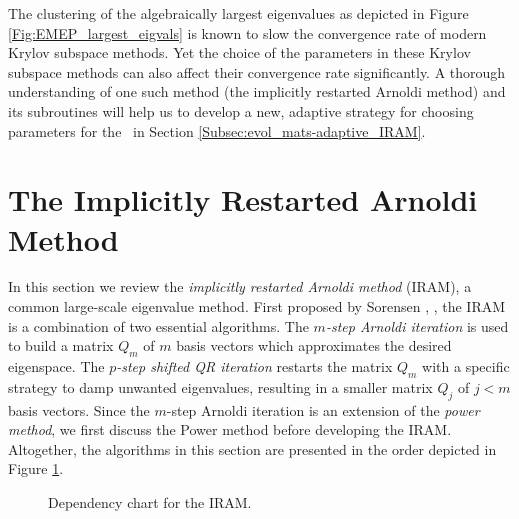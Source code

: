 The clustering of the algebraically largest eigenvalues as depicted in Figure \ref{Fig:EMEP_largest_eigvals} is known to slow the convergence rate of modern Krylov subspace methods.
Yet the choice of the parameters in these Krylov subspace methods can also affect their convergence rate significantly.
A thorough understanding of one such method (the implicitly restarted Arnoldi method) and its subroutines will help us to develop a new, adaptive strategy for choosing parameters for the \emep \ in Section \ref{Subsec:evol_mats-adaptive_IRAM}.






\section{The Implicitly Restarted Arnoldi Method}		\label{Subsec:evol_mats-IRAM}






In this section we review the \textit{implicitly restarted Arnoldi method} (IRAM), a common large-scale eigenvalue method.  
First proposed by Sorensen \cite{sorensen1992implicit}, \cite{sorensen1997implicitly}, the IRAM is a combination of two essential algorithms.  
The \textit{$m$-step Arnoldi iteration} is used to build a matrix $Q_m$ of $m$ basis vectors which approximates the desired eigenspace.  
The \textit{$p$-step shifted QR iteration} restarts the matrix $Q_m$ with a specific strategy to damp unwanted eigenvalues, resulting in a smaller matrix $Q_j$ of $j<m$ basis vectors.  
Since the $m$-step Arnoldi iteration is an extension of the \textit{power method}, we first discuss the Power method before developing the IRAM.  
Altogether, the algorithms in this section are presented in the order depicted in Figure \ref{Fig:IRAM_flowchart}.

\begin{figure}[H] 
\centering
{}
\caption{Dependency chart for the IRAM.}
\label{Fig:IRAM_flowchart}
\end{figure}

